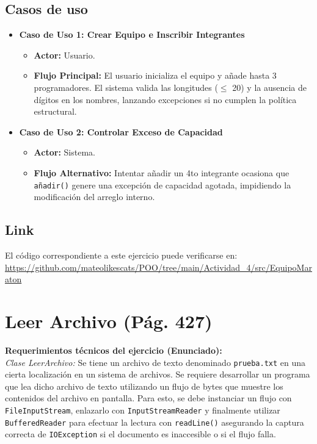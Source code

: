 \documentclass[a4paper,11pt]{article}
\begin{document}
\subsection{Casos de uso}
\begin{itemize}
    \item \textbf{Caso de Uso 1: Crear Equipo e Inscribir Integrantes}
    \begin{itemize}
        \item \textbf{Actor:} Usuario.
        \item \textbf{Flujo Principal:} El usuario inicializa el equipo y añade hasta 3 programadores. El sistema valida las longitudes ($\le$ 20) y la ausencia de dígitos en los nombres, lanzando excepciones si no cumplen la política estructural.
    \end{itemize}
    \item \textbf{Caso de Uso 2: Controlar Exceso de Capacidad}
    \begin{itemize}
        \item \textbf{Actor:} Sistema.
        \item \textbf{Flujo Alternativo:} Intentar añadir un 4to integrante ocasiona que \texttt{añadir()} genere una excepción de capacidad agotada, impidiendo la modificación del arreglo interno.
    \end{itemize}
\end{itemize}

\subsection{Link}
El código correspondiente a este ejercicio puede verificarse en:
\url{https://github.com/mateolikescats/POO/tree/main/Actividad_4/src/EquipoMaraton}

\newpage

\section{Leer Archivo (Pág. 427)}
\textbf{Requerimientos técnicos del ejercicio (Enunciado):}\\
\textit{Clase LeerArchivo:} Se tiene un archivo de texto denominado \texttt{prueba.txt} en una cierta localización en un sistema de archivos. Se requiere desarrollar un programa que lea dicho archivo de texto utilizando un flujo de bytes que muestre los contenidos del archivo en pantalla. Para esto, se debe instanciar un flujo con \texttt{FileInputStream}, enlazarlo con \texttt{InputStreamReader} y finalmente utilizar \texttt{BufferedReader} para efectuar la lectura con \texttt{readLine()} asegurando la captura correcta de \texttt{IOException} si el documento es inaccesible o si el flujo falla.
\end{document}
